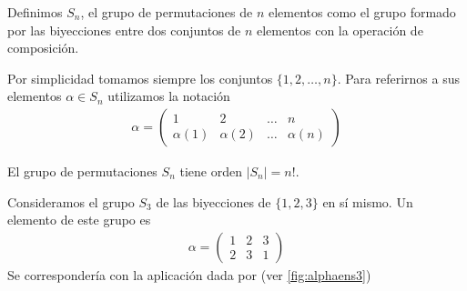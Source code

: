 \begin{dfn}
	\label{dfn:sn}
	Definimos $S_n$, el grupo de permutaciones de $n$ elementos como el grupo formado por las biyecciones entre dos conjuntos de $n$ elementos con la operación de composición.
	
	Por simplicidad tomamos siempre los conjuntos $\{1, 2, \dots, n\}$. Para referirnos a sus elementos $\alpha \in S_n$ utilizamos la notación
	\begin{align*}
		\alpha = \left(\begin{array}{cccc}
		1 & 2 & \dots & n \\
		\alpha(1) & \alpha(2) & \dots & \alpha(n)
		\end{array}\right)
	\end{align*}
\end{dfn}

\begin{obs}
	El grupo de permutaciones $S_n$ tiene orden $|S_n| = n!$.
\end{obs}

\begin{ej}
	Consideramos el grupo $S_3$ de las biyecciones de $\{1,2,3\}$ en sí mismo. Un elemento de este grupo es
	\begin{align*}
		\alpha = \left(\begin{array}{ccc}
		1 & 2 & 3 \\
		2 & 3 & 1
		\end{array}\right)
	\end{align*}
	Se correspondería con la aplicación dada por (ver \autoref{fig:alphaens3})
\end{ej}

